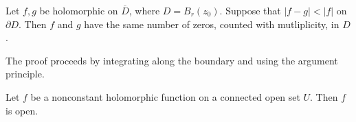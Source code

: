 
\begin{theorem}[Rouche]\label{thm:?}
	Let $f,g$ be holomorphic on $\overline{D} $, where $D = B_r(z_0)$. Suppose that $\left| f-g \right| <\left| f \right| $ on $\partial D$. Then $f$ and $g$ have the same number of zeros, counted with mutliplicity, in $D$.
\end{theorem}
The proof proceeds by integrating along the boundary and using the argument principle.

\begin{theorem}\label{thm:????}
	Let $f$ be a nonconstant holomorphic function on a connected open set $U$. Then $f$ is open.
\end{theorem}

